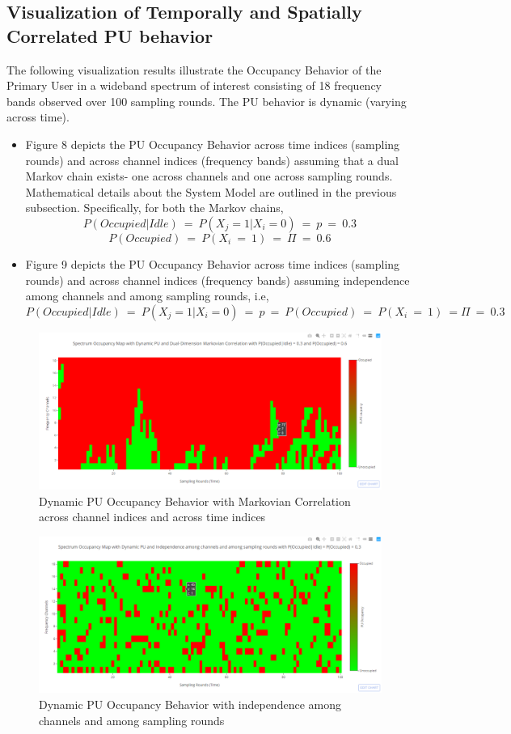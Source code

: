 \documentclass[12pt, draftcls, onecolumn]{IEEEtran}
\begin{document}
\subsection{Visualization of Temporally and Spatially Correlated PU behavior}
The following visualization results illustrate the Occupancy Behavior of the Primary User in a wideband spectrum of interest consisting of 18 frequency bands observed over 100 sampling rounds. The PU behavior is dynamic (varying across time).
\begin{itemize}
    \item Figure 8 depicts the PU Occupancy Behavior across time indices (sampling rounds) and across channel indices (frequency bands) assuming that a dual Markov chain exists- one across channels and one across sampling rounds. Mathematical details about the System Model are outlined in the previous subsection. Specifically, for both the Markov chains, 
    \[P(Occupied|Idle)\ =\ P(X_j = 1|X_i = 0)\ =\ p\ =\ 0.3\]
    \[P(Occupied)\ =\ P(X_i\ =\ 1)\ =\ \Pi\ =\ 0.6\]
    \item Figure 9 depicts the PU Occupancy Behavior across time indices (sampling rounds) and across channel indices (frequency bands) assuming independence among channels and among sampling rounds, i.e,
    \[P(Occupied|Idle)\ =\ P(X_j = 1|X_i = 0)\ =\ p\ =\ P(Occupied)\ =\ P(X_i\ =\ 1)\ = \Pi\ =\ 0.3\]
\end{itemize}
\begin{figure}[t]
\includegraphics[width=1.0\textwidth]{Spectrum_Occupancy_HeatMap_Dynamic_SpatioTemporal_Corr.png}
\caption{Dynamic PU Occupancy Behavior with Markovian Correlation across channel indices and across time indices}
\label{fig:mesh8}
\centering
\end{figure}
\begin{figure}[t]
\includegraphics[width=1.0\textwidth]{Spectrum_Occupancy_HeatMap_Dynamic_Independence.png}
\caption{Dynamic PU Occupancy Behavior with independence among channels and among sampling rounds}
\label{fig:mesh9}
\centering
\end{figure}
\end{document}
